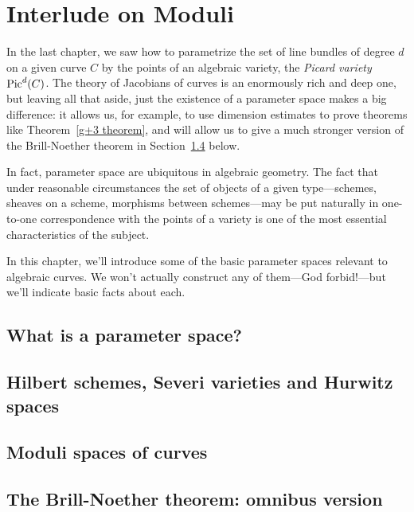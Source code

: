 

\chapter{Interlude on Moduli}
\label{ModuliInterlude}

In the last chapter, we saw how to parametrize the set of line bundles of degree $d$ on a given curve $C$ by the points of an algebraic variety, the \emph{Picard variety} $\Pic^d(C)$. The theory of  Jacobians of curves is an enormously rich and deep one, but leaving all that aside, just the existence of a parameter space makes a big difference: it allows us, for example, to use dimension estimates to prove theorems like Theorem~\ref{g+3 theorem}, and will allow us to give a much stronger version of the Brill-Noether theorem in Section~\ref{BNomnibus} below.

In fact, parameter space are ubiquitous in algebraic geometry. The fact that under reasonable circumstances the set of objects of a given type---schemes, sheaves on a scheme, morphisms between schemes---may be put naturally in one-to-one correspondence with the points of a variety is one of the most essential characteristics of the subject.

In this chapter, we'll introduce some of the basic parameter spaces relevant to algebraic curves. We won't actually construct any of them---God forbid!---but we'll indicate basic facts about each.

\section{What is a parameter space?}

\section{Hilbert schemes, Severi varieties and Hurwitz spaces}

\section{Moduli spaces of curves}

\section{The Brill-Noether theorem: omnibus version}\label{BNomnibus}

